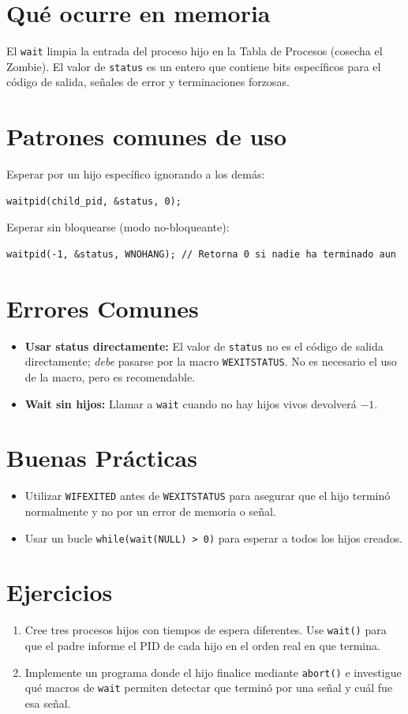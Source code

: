 \documentclass[12pt,a4paper]{article}
\begin{document}
\section{Qué ocurre en memoria}
El \texttt{wait} limpia la entrada del proceso hijo en la Tabla de Procesos (cosecha el Zombie). El valor de \texttt{status} es un entero que contiene bits específicos para el código de salida, señales de error y terminaciones forzosas.

\section{Patrones comunes de uso}
Esperar por un hijo específico ignorando a los demás:
\begin{lstlisting}
waitpid(child_pid, &status, 0);
\end{lstlisting}
Esperar sin bloquearse (modo no-bloqueante):
\begin{lstlisting}
waitpid(-1, &status, WNOHANG); // Retorna 0 si nadie ha terminado aun
\end{lstlisting}

\section{Errores Comunes}
\begin{itemize}
    \item \textbf{Usar status directamente:} El valor de \texttt{status} no es el código de salida directamente; \textit{debe} pasarse por la macro \texttt{WEXITSTATUS}. No es necesario el uso de la macro, pero es recomendable.
    \item \textbf{Wait sin hijos:} Llamar a \texttt{wait} cuando no hay hijos vivos devolverá $-1$.
\end{itemize}

\section{Buenas Prácticas}
\begin{itemize}
    \item Utilizar \texttt{WIFEXITED} antes de \texttt{WEXITSTATUS} para asegurar que el hijo terminó normalmente y no por un error de memoria o señal.
    \item Usar un bucle \texttt{while(wait(NULL) > 0)} para esperar a todos los hijos creados.
\end{itemize}

\section{Ejercicios}
\begin{enumerate}
    \item Cree tres procesos hijos con tiempos de espera diferentes. Use \texttt{wait()} para que el padre informe el PID de cada hijo en el orden real en que termina.
    \item Implemente un programa donde el hijo finalice mediante \texttt{abort()} e investigue qué macros de \texttt{wait} permiten detectar que terminó por una señal y cuál fue esa señal.
\end{enumerate}
\end{document}
